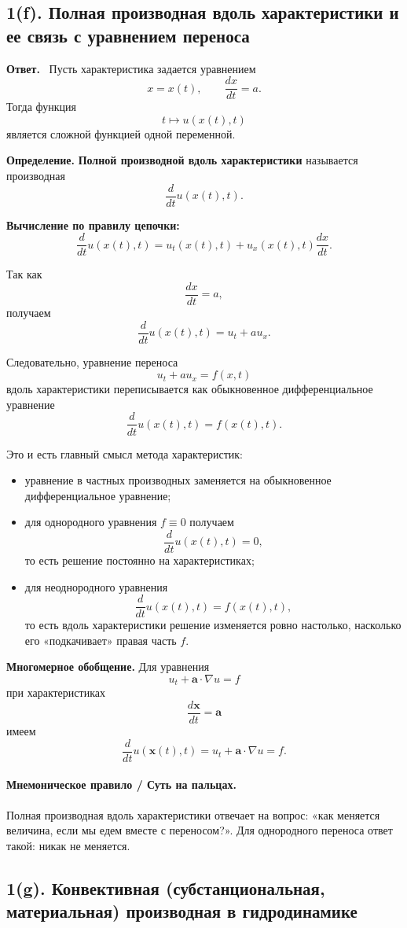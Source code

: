 \documentclass[a4paper,12pt]{article}
\newcommand{\Answer}{\textbf{Ответ.}\ }
\begin{document}
\subsection*{1(f). Полная производная вдоль характеристики и ее связь с уравнением переноса}

\Answer
Пусть характеристика задается уравнением
\[
x=x(t),
\qquad \frac{dx}{dt}=a.
\]
Тогда функция
\[
t\longmapsto u(x(t),t)
\]
является сложной функцией одной переменной.

\textbf{Определение.} \textbf{Полной производной вдоль характеристики} называется производная
\[
\frac{d}{dt}u(x(t),t).
\]

\textbf{Вычисление по правилу цепочки:}
\[
\frac{d}{dt}u(x(t),t)=u_t(x(t),t)+u_x(x(t),t)\frac{dx}{dt}.
\]

Так как
\[
\frac{dx}{dt}=a,
\]
получаем
\[
\frac{d}{dt}u(x(t),t)=u_t+a u_x.
\]

Следовательно, уравнение переноса
\[
u_t+a u_x=f(x,t)
\]
вдоль характеристики переписывается как обыкновенное дифференциальное уравнение
\[
\frac{d}{dt}u(x(t),t)=f(x(t),t).
\]

Это и есть главный смысл метода характеристик:
\begin{itemize}
  \item уравнение в частных производных заменяется на обыкновенное дифференциальное уравнение;
  \item для однородного уравнения $f\equiv 0$ получаем
  \[
  \frac{d}{dt}u(x(t),t)=0,
  \]
  то есть решение постоянно на характеристиках;
  \item для неоднородного уравнения
  \[
  \frac{d}{dt}u(x(t),t)=f(x(t),t),
  \]
  то есть вдоль характеристики решение изменяется ровно настолько, насколько его «подкачивает» правая часть $f$.
\end{itemize}

\textbf{Многомерное обобщение.} Для уравнения
\[
u_t+\mathbf{a}\cdot\nabla u=f
\]
при характеристиках
\[
\frac{d\mathbf{x}}{dt}=\mathbf{a}
\]
имеем
\[
\frac{d}{dt}u(\mathbf{x}(t),t)=u_t+\mathbf{a}\cdot\nabla u=f.
\]

\paragraph{Мнемоническое правило / Суть на пальцах.}
Полная производная вдоль характеристики отвечает на вопрос: «как меняется величина, если мы едем вместе с переносом?». Для однородного переноса ответ такой: никак не меняется.

\subsection*{1(g). Конвективная (субстанциональная, материальная) производная в гидродинамике}
\end{document}
